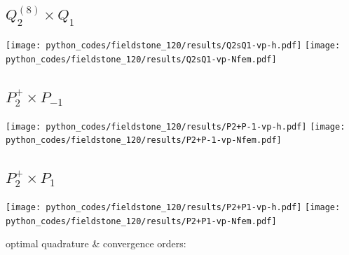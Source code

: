 \subsection*{$Q_2^{(8)}\times Q_1$}
\begin{center}
\texttt{[image: python\_codes/fieldstone\_120/results/Q2sQ1-vp-h.pdf]}
\texttt{[image: python\_codes/fieldstone\_120/results/Q2sQ1-vp-Nfem.pdf]}
\end{center}

\subsection*{$P_2^+\times P_{-1}$}
\begin{center}
\texttt{[image: python\_codes/fieldstone\_120/results/P2+P-1-vp-h.pdf]}
\texttt{[image: python\_codes/fieldstone\_120/results/P2+P-1-vp-Nfem.pdf]}
\end{center}

\subsection*{$P_2^+\times P_{1}$}
\begin{center}
\texttt{[image: python\_codes/fieldstone\_120/results/P2+P1-vp-h.pdf]}
\texttt{[image: python\_codes/fieldstone\_120/results/P2+P1-vp-Nfem.pdf]}
\end{center}



\newpage
optimal quadrature \& convergence orders:

